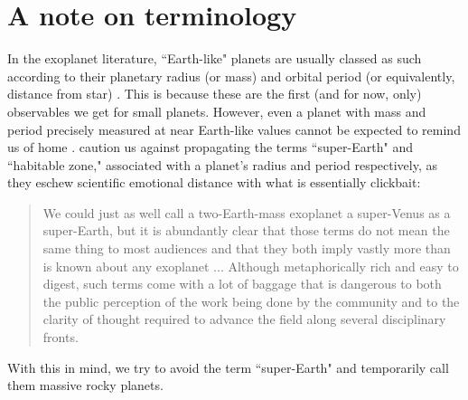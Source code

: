 \section{A note on terminology}
In the exoplanet literature, ``Earth-like" planets are usually classed as such according to their planetary radius (or mass) and orbital period (or equivalently, distance from star) \citep{Guimond2018}. This is because these are the first (and for now, only) observables we get for small planets. However, even a planet with mass and period precisely measured at near Earth-like values cannot be expected to remind us of home \citep{Tasker2017}. \citet{Moore2017} caution us against propagating the terms ``super-Earth" and ``habitable zone," associated with a planet's radius and period respectively, as they eschew scientific emotional distance with what is essentially clickbait:
\begin{quote}
We could just as well call a two-Earth-mass exoplanet a super-Venus as a super-Earth, but it is abundantly clear that those terms do not mean the same thing to most audiences and that they both imply vastly more than is known about any exoplanet ... Although metaphorically rich and easy to digest, such terms come with a lot of baggage that is dangerous to both the public perception of the work being done by the community and to the clarity of thought required to advance the field along several disciplinary fronts.
\end{quote}

With this in mind, we try to avoid the term ``super-Earth" and temporarily call them massive rocky planets. 